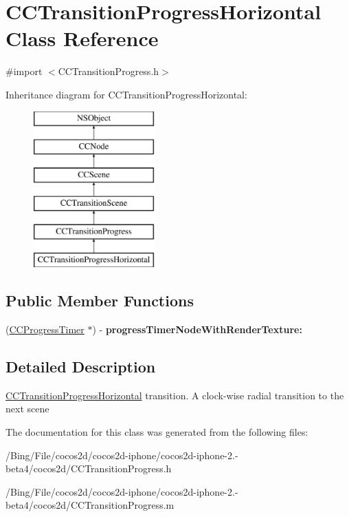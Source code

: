 \hypertarget{interface_c_c_transition_progress_horizontal}{\section{C\-C\-Transition\-Progress\-Horizontal Class Reference}
\label{interface_c_c_transition_progress_horizontal}
}


{\ttfamily \#import $<$C\-C\-Transition\-Progress.\-h$>$}

Inheritance diagram for C\-C\-Transition\-Progress\-Horizontal\-:\begin{figure}[H]
\begin{center}
\leavevmode
\includegraphics[height=6.000000cm]{interface_c_c_transition_progress_horizontal}
\end{center}
\end{figure}
\subsection*{Public Member Functions}
\begin{DoxyCompactItemize}
\item 
\hypertarget{interface_c_c_transition_progress_horizontal_ad8a45a8e084825850359343e3979e8fc}{(\hyperlink{interface_c_c_progress_timer}{C\-C\-Progress\-Timer} $\ast$) -\/ {\bfseries progress\-Timer\-Node\-With\-Render\-Texture\-:}}\label{interface_c_c_transition_progress_horizontal_ad8a45a8e084825850359343e3979e8fc}

\end{DoxyCompactItemize}


\subsection{Detailed Description}
\hyperlink{interface_c_c_transition_progress_horizontal}{C\-C\-Transition\-Progress\-Horizontal} transition. A clock-\/wise radial transition to the next scene 

The documentation for this class was generated from the following files\-:\begin{DoxyCompactItemize}
\item 
/\-Bing/\-File/cocos2d/cocos2d-\/iphone/cocos2d-\/iphone-\/2.-\/beta4/cocos2d/C\-C\-Transition\-Progress.\-h\item 
/\-Bing/\-File/cocos2d/cocos2d-\/iphone/cocos2d-\/iphone-\/2.-\/beta4/cocos2d/C\-C\-Transition\-Progress.\-m\end{DoxyCompactItemize}
